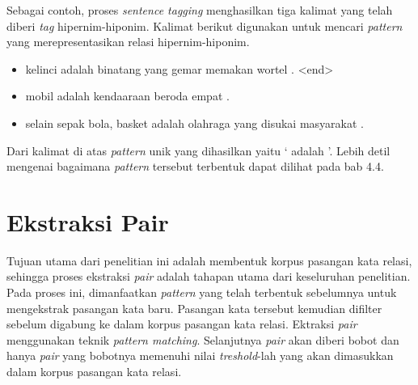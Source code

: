 Sebagai contoh, proses \textit{sentence tagging} menghasilkan tiga kalimat yang telah diberi \textit{tag} hipernim-hiponim. Kalimat berikut digunakan untuk mencari \textit{pattern} yang merepresentasikan relasi hipernim-hiponim.
\begin{itemize}
  \item {\tagStart} {\tagHyponym}kelinci{\tagHyponym} adalah {\tagHypernym}binatang{\tagHypernym} yang gemar memakan wortel . {\selectfont<end>}
  \item {\tagStart} {\tagHyponym}mobil{\tagHyponym} adalah {\tagHypernym}kendaaraan{\tagHypernym} beroda empat . {\tagEnd}
  \item {\tagStart} selain sepak bola, {\tagHyponym}basket{\tagHyponym} adalah {\tagHypernym}olahraga{\tagHypernym} yang disukai masyarakat . {\tagEnd}
\end{itemize}

\noindent Dari kalimat di atas \textit{pattern} unik yang dihasilkan yaitu `{\tagHyponym} adalah {\tagHypernym}'. Lebih detil mengenai bagaimana \textit{pattern} tersebut terbentuk dapat dilihat pada bab 4.4.


\section{Ekstraksi Pair}
Tujuan utama dari penelitian ini adalah membentuk korpus pasangan kata relasi, sehingga proses ekstraksi \textit{pair} adalah tahapan utama dari keseluruhan penelitian. Pada proses ini, dimanfaatkan \textit{pattern} yang telah terbentuk sebelumnya untuk mengekstrak pasangan kata baru. Pasangan kata tersebut kemudian difilter sebelum digabung ke dalam korpus pasangan kata relasi. Ektraksi \textit{pair} menggunakan teknik \textit{pattern matching}. Selanjutnya \textit{pair} akan diberi bobot dan hanya \textit{pair} yang bobotnya memenuhi nilai \textit{treshold}-lah yang akan dimasukkan dalam korpus pasangan kata relasi.

